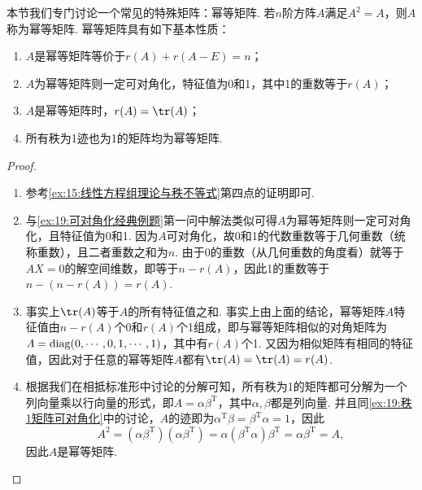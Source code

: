 本节我们专门讨论一个常见的特殊矩阵：幂等矩阵. 若$n$阶方阵$A$满足$A^2=A$，则$A$称为幂等矩阵. 幂等矩阵具有如下基本性质：
\begin{enumerate}
    \item $A$是幂等矩阵等价于$r(A)+r(A-E)=n$；

    \item $A$为幂等矩阵则一定可对角化，特征值为0和1，其中1的重数等于$r(A)$；

    \item $A$是幂等矩阵时，$r(A)=\tr(A)$；

    \item 所有秩为1迹也为1的矩阵均为幂等矩阵.
\end{enumerate}

\begin{proof}
    \begin{enumerate}
        \item 参考\autoref{ex:15:线性方程组理论与秩不等式}第四点的证明即可.

        \item 与\autoref{ex:19:可对角化经典例题}第一问中解法类似可得$A$为幂等矩阵则一定可对角化，且特征值为0和1. 因为$A$可对角化，故0和1的代数重数等于几何重数（统称重数），且二者重数之和为$n$. 由于0的重数（从几何重数的角度看）就等于$AX=0$的解空间维数，即等于$n-r(A)$，因此1的重数等于$n-(n-r(A))=r(A)$.

        \item 事实上$\tr(A)$等于$A$的所有特征值之和. 事实上由上面的结论，幂等矩阵$A$特征值由$n-r(A)$个0和$r(A)$个1组成，即与幂等矩阵相似的对角矩阵为$\varLambda=\operatorname{diag}(0,\cdots,0,1,\cdots,1)$，其中有$r(A)$个1. 又因为相似矩阵有相同的特征值，因此对于任意的幂等矩阵$A$都有$\tr(A)=\tr(\varLambda)=r(A)$.

        \item 根据我们在相抵标准形中讨论的分解可知，所有秩为1的矩阵都可分解为一个列向量乘以行向量的形式，即$A=\alpha\beta^\mathrm{T}$，其中$\alpha,\beta$都是列向量. 并且同\autoref{ex:19:秩1矩阵可对角化}中的讨论，$A$的迹即为$\alpha^\mathrm{T}\beta=\beta^\mathrm{T}\alpha=1$，因此
        \[A^2=(\alpha\beta^\mathrm{T})(\alpha\beta^\mathrm{T})=\alpha(\beta^\mathrm{T}\alpha)\beta^\mathrm{T}=\alpha\beta^\mathrm{T}=A,\]
        因此$A$是幂等矩阵.
    \end{enumerate}
\end{proof}

